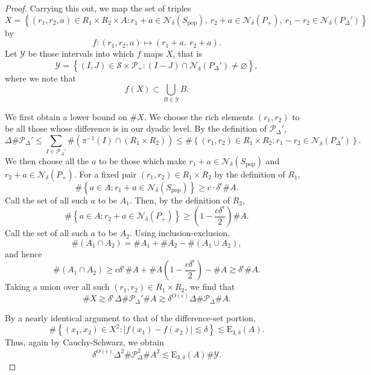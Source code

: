 \documentclass[10pt,a4paper]{amsart}
\newcommand{\cP}{\mathcal{P}}
\newcommand{\cS}{\mathcal{S}}
\newcommand{\cY}{\mathcal{Y}}
\begin{document}
\begin{proof}
Carrying this out, we map the set of triples
\[
	X = \left\{ (r_1,r_2,a)\in R_1 \times R_2 \times A : r_1 + a \in \mathcal{N} _{\delta} (S_{\text{pop}} ),~ r_2 + a \in \mathcal{N} _{\delta} (P_{+} ),~ r_1 - r_2 \in \mathcal{N} _{\delta} (P_{\Delta}' ) \right\} 
\]
by
\[
	f : (r_1,r_2,a) \mapsto (r_1 + a ,~ r_2 + a)
.\]
Let \(\mathcal{Y} \) be those intervals into which \(f\) maps \(X\), that is
\[
	\mathcal{Y} = \left\{ (I,J)\in\cS \times \cP_{+}  	: \left( I - J \right) \cap \mathcal{N} _{\delta} (P_{\Delta} ') \neq \varnothing  \right\} 	
,\]
where we note that
\[
	f(X) \subset \bigcup_{B \in \cY} B
.\]

We first obtain a lower bound on \(\# X\).
We choose the rich elements \((r_1,r_2)\) to be all those whose difference is in our dyadic level.
By the definition of \(\mathcal{P} _{\Delta} '\), 
\[
	\Delta \# \mathcal{P} _{\Delta}' \leq \sum _{I \in \mathcal{P} _{\Delta}' } \# \left( \pi ^{-1} (I)\cap (R_1 \times R_2) \right) \leq  \# \left\{ (r_1,r_2)\in R_1 \times R_2 : r_1 - r_2 \in \mathcal{N} _{\delta} (P_{\Delta}' )  \right\} 
.\]
We then choose all the \(a\) to be those which make \(r_1 + a \in \mathcal{N} _{\delta} (S_{\text{pop}} ) \) and \(r_2 + a \in \mathcal{N} _{\delta} (P_{+} 	) \).
For a fixed pair \((r_1,r_2)\in R_1 \times R_2\) by the definition of \(R_1\),
\[
	\# \left\{ a \in A : r_1 + a \in \mathcal{N} _{\delta} (S_{\text{pop}} ) \right\} \geq c \cdot \delta^{\epsilon}\# A
.\]
Call the set of all such \(a\) to be \(A_1\). Then, by the definition of \(R_2\),
\[
	\# \left\{ a \in A : r_2 + a \in \mathcal{N} _{\delta} (P_{+} )  \right\} \geq \left( 1 - \frac{c \delta ^{\epsilon}}{2}  \right) \# A
.\]
Call the set of all such \(a\) to be \(A_2\).
Using inclusion-exclusion,
\[
	\# \left( A_1 \cap A_2 \right) = \# A_1 + \# A_2 - \# \left( A_1 \cup A_2 \right) 
,\]
and hence
\[
	\# \left( A_1 \cap A_2 \right) \geq c \delta^{\epsilon}\# A + \# A \left( 1 - \frac{c \delta^{\epsilon}}{2}  \right) - \# A \gtrsim \delta^{\epsilon} \# A
.\]
Taking a union over all such \((r_1,r_2)\in R_1 \times R_2\), we find that
\[
	\# X \gtrsim \delta^{\epsilon} \Delta \# \mathcal{P} _{\Delta}' \# A \gtrsim \delta^{O(\epsilon)} \Delta \# \mathcal{P} _{\Delta}  \# A
.\]

By a nearly identical argument to that of the difference-set portion,
\[
	\# \left\{ (x_1,x_2)\in X^{2} : \left\lvert f(x_1) - f(x_2) \right\rvert \lesssim \delta \right\} \lesssim \mathrm{E} _{3,\delta} (A)
.\]
Thus, again by Cauchy-Schwarz, we obtain
\begin{equation} \label{eq:sum-post-CS}
	\delta^{O(\epsilon)} \Delta^{2} \# \mathcal{P} _{\Delta} ^{2}\# A ^{2} \lesssim \mathrm{E} _{3,\delta} (A) \# \mathcal{Y} .
\end{equation}


\end{proof}
\end{document}
